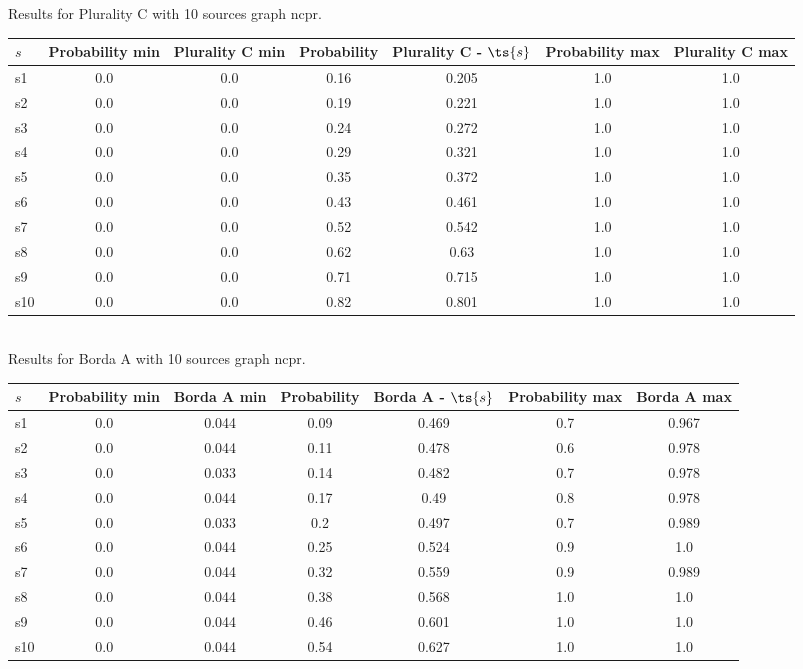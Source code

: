 \documentclass{article}
\begin{document}
\noindent Results for Plurality C with 10 sources graph ncpr.

\noindent\begin{tabular}{|l|c|c|c|c|c|c|}
\hline
$s$& Probability min & Plurality C min & Probability & Plurality C - $\ts{s}$ & Probability max & Plurality C max\\
\hline
s1 &0.0 & 0.0 & 0.16 & 0.205 & 1.0 & 1.0\\
\hline
s2 &0.0 & 0.0 & 0.19 & 0.221 & 1.0 & 1.0\\
\hline
s3 &0.0 & 0.0 & 0.24 & 0.272 & 1.0 & 1.0\\
\hline
s4 &0.0 & 0.0 & 0.29 & 0.321 & 1.0 & 1.0\\
\hline
s5 &0.0 & 0.0 & 0.35 & 0.372 & 1.0 & 1.0\\
\hline
s6 &0.0 & 0.0 & 0.43 & 0.461 & 1.0 & 1.0\\
\hline
s7 &0.0 & 0.0 & 0.52 & 0.542 & 1.0 & 1.0\\
\hline
s8 &0.0 & 0.0 & 0.62 & 0.63 & 1.0 & 1.0\\
\hline
s9 &0.0 & 0.0 & 0.71 & 0.715 & 1.0 & 1.0\\
\hline
s10 &0.0 & 0.0 & 0.82 & 0.801 & 1.0 & 1.0\\
\hline
\end{tabular}\\

\noindent Results for Borda A with 10 sources graph ncpr.

\noindent\begin{tabular}{|l|c|c|c|c|c|c|}
\hline
$s$& Probability min & Borda A min & Probability & Borda A - $\ts{s}$ & Probability max & Borda A max\\
\hline
s1 &0.0 & 0.044 & 0.09 & 0.469 & 0.7 & 0.967\\
\hline
s2 &0.0 & 0.044 & 0.11 & 0.478 & 0.6 & 0.978\\
\hline
s3 &0.0 & 0.033 & 0.14 & 0.482 & 0.7 & 0.978\\
\hline
s4 &0.0 & 0.044 & 0.17 & 0.49 & 0.8 & 0.978\\
\hline
s5 &0.0 & 0.033 & 0.2 & 0.497 & 0.7 & 0.989\\
\hline
s6 &0.0 & 0.044 & 0.25 & 0.524 & 0.9 & 1.0\\
\hline
s7 &0.0 & 0.044 & 0.32 & 0.559 & 0.9 & 0.989\\
\hline
s8 &0.0 & 0.044 & 0.38 & 0.568 & 1.0 & 1.0\\
\hline
s9 &0.0 & 0.044 & 0.46 & 0.601 & 1.0 & 1.0\\
\hline
s10 &0.0 & 0.044 & 0.54 & 0.627 & 1.0 & 1.0\\
\hline
\end{tabular}\\
\end{document}
